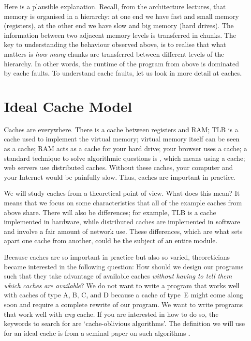 Here is a plausible explanation.
Recall, from the architecture lectures,
  that memory is organised in a hierarchy:
  at one end we have fast and small memory (registers),
  at the other end we have slow and big memory (hard drives).
The information between two adjacent memory levels is transferred in chunks.
The key to understanding the behaviour observed above,
  is to realise that what matters is
    \emph{how many} chunks are transferred between different levels of the hierarchy.
In other words,
  the runtime of the program from above is dominated by cache faults.
To understand cache faults,
  let us look in more detail at caches.


\section{Ideal Cache Model}

Caches are everywhere.
There is a cache between registers and RAM;
  TLB is a cache used to implement the virtual memory;
  virtual memory itself can be seen as a cache;
  RAM acts as a cache for your hard drive;
  your browser uses a cache;
  a standard technique to solve algorithmic questions is ,
    which means using a cache;
  web servers use distributed caches.
Without these caches, your computer and your Internet would be painfully slow.
Thus, caches are important in practice.

We will study caches from a theoretical point of view.
What does this mean?
It means that we focus on some characteristics
  that all of the example caches from above share.
There will also be differences; for example,
  TLB is a cache implemented in hardware,
  while distributed caches are implemented in software
    and involve a fair amount of network use.
These differences, which are what sets apart one cache from another,
  could be the subject of an entire module.

Because caches are so important in practice but also so varied,
  theoreticians became interested in the following question:
How should we design our programs such that they take advantage of available caches
  \emph{without having to tell them which caches are available}?
We do not want to write a program that works well with caches of type
  A, B, C, and D because a cache of type~E might come along soon
  and require a complete rewrite of our program.
We want to write programs that work well with \emph{any} cache.
If you are interested in how to do so,
  the keywords to search for are `cache-oblivious algorithms'.
The definition we will use for an ideal cache
  is from a seminal paper on such algorithms \citep{cache-oblivious}.


